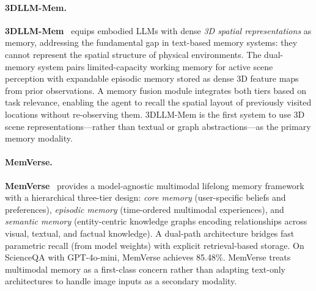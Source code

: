 \paragraph{3DLLM-Mem.}
\textbf{3DLLM-Mem}~\cite{threedllmmem2025} equips embodied LLMs with
dense \emph{3D spatial representations} as memory, addressing the
fundamental gap in text-based memory systems: they cannot represent the
spatial structure of physical environments.  The dual-memory system
pairs limited-capacity working memory for active scene perception with
expandable episodic memory stored as dense 3D feature maps from prior
observations.  A memory fusion module integrates both tiers based on
task relevance, enabling the agent to recall the spatial layout of
previously visited locations without re-observing them.  3DLLM-Mem
is the first system to use 3D scene representations---rather than
textual or graph abstractions---as the primary memory modality.

\paragraph{MemVerse.}
\textbf{MemVerse}~\cite{memverse2025} provides a model-agnostic
multimodal lifelong memory framework with a hierarchical three-tier
design: \emph{core memory} (user-specific beliefs and preferences),
\emph{episodic memory} (time-ordered multimodal experiences), and
\emph{semantic memory} (entity-centric knowledge graphs encoding
relationships across visual, textual, and factual knowledge).  A
dual-path architecture bridges fast parametric recall (from model
weights) with explicit retrieval-based storage.  On ScienceQA with
GPT-4o-mini, MemVerse achieves 85.48\%.  MemVerse treats multimodal
memory as a first-class concern rather than adapting text-only
architectures to handle image inputs as a secondary modality.
